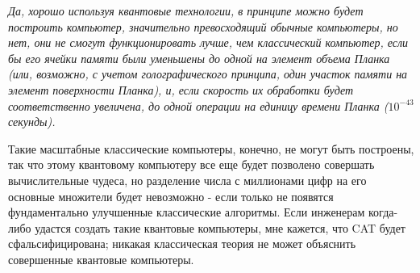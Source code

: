 \documentclass[main.tex]{subfiles}
\begin{document}
\textit{Да, хорошо используя квантовые технологии, в принципе можно будет построить компьютер, значительно превосходящий обычные компьютеры, но нет, они не смогут функционировать лучше, чем классический компьютер, если бы его ячейки памяти были уменьшены до одной на элемент объема Планка (или, возможно, с учетом голографического принципа, один участок памяти на элемент поверхности Планка), и, если скорость их обработки будет соответственно увеличена, до одной операции на единицу времени Планка ($10^{-43}$ секунды).}


Такие масштабные классические компьютеры, конечно, не могут быть построены, так что этому квантовому компьютеру все еще будет позволено совершать вычислительные чудеса, но разделение числа с миллионами цифр на его основные множители будет невозможно - если только не появятся фундаментально улучшенные классические алгоритмы. Если инженерам когда-либо удастся создать такие квантовые компьютеры, мне кажется, что CAT будет сфальсифицирована; никакая классическая теория не может объяснить совершенные квантовые компьютеры.
\end{document}
